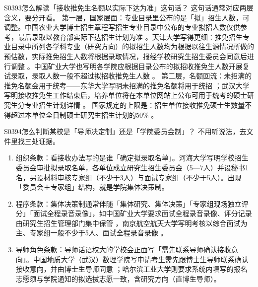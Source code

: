 \begin{qa}{S0393}{怎么解读「接收推免生名额以实际下达为准」这句话？}
这句话通常对应两层含义，要分开看。
第一层，国家层面：专业目录里公布的是「拟」招生人数，可调整。中国农业大学博士招生章程写招生专业目录中公布的专业拟招人数仅供参考，最后录取以教育部实际下达招生计划为准 。天津大学写得更细：推免招生专业目录中所列各学科专业（研究方向）的拟招生人数均为根据以往生源情况所做的预估数，实际推免招生人数将根据录取情况，报经学校研究生招生委员会同意后进行调整 。中国矿业大学也写明各学院应根据目录公布的拟招收推免生人数开展复试录取，录取人数一般不超过拟招收推免生人数 。
第二层，名额回流：未招满的推免名额会用于统考——东华大学写明未招满的推免名额将用于统招 ；武汉大学写明接收推免生工作结束后，培养单位将在本单位网站上公布可用于统考的硕士研究生分专业招生计划详情 。
国家规定的上限是：招生单位接收推免硕士生数量不得超过本单位全日制硕士研究生招生计划的50\% 。
\end{qa}

\begin{qa}{S0394}{怎么判断某校是「导师决定制」还是「学院委员会制」？}
不用听说法，去文件里找三处证据。
\begin{enumerate}
  \item 组织条款：看接收办法写的是谁「确定拟录取名单」。河海大学写明学校招生委员会审批拟录取名单，各单位成立研究生招生委员会（5—7人）并设秘书1名，另设材料审核专家组（不少于3人）与面试专家组（不少于5人）。出现「委员会＋专家组」结构，就是学院集体决策制。
  \item 程序条款：集体决策制通常伴随「集体研究、集体决策」「专家组现场独立评分」「面试全程录音录像」，如中国矿业大学要求面试全程录音录像、评分记录由研究生招生管理部门集中保管 ，南京航空航天大学写明考核以综合面试为主、专家组一般不少于5人、面试全程录音录像 。
  \item 导师角色条款：导师话语权大的学校会正面写「需先联系导师确认接收意向」。中国地质大学（武汉）数理学院写申请考生需先跟博士生导师联系确认接收意向，并由博士生导师同意 ；哈尔滨工业大学则要求系统内填写的报名志愿须与学院通知的拟选拔志愿一致，含研究方向（直博生导师）。
\end{enumerate}
\end{qa}

